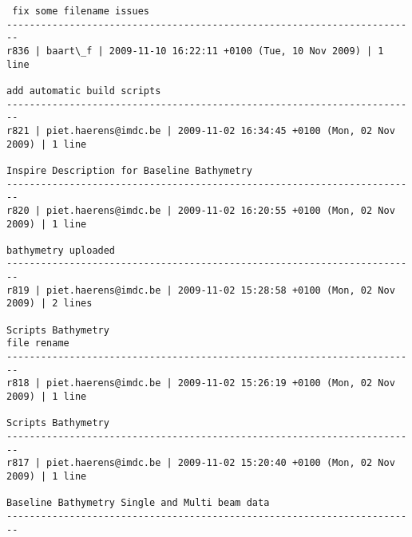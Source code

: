\documentclass[9]{report}
\begin{document}
\begin{description}
\begin{verbatim}
 fix some filename issues
------------------------------------------------------------------------
r836 | baart\_f | 2009-11-10 16:22:11 +0100 (Tue, 10 Nov 2009) | 1 line

add automatic build scripts
------------------------------------------------------------------------
r821 | piet.haerens@imdc.be | 2009-11-02 16:34:45 +0100 (Mon, 02 Nov 2009) | 1 line

Inspire Description for Baseline Bathymetry
------------------------------------------------------------------------
r820 | piet.haerens@imdc.be | 2009-11-02 16:20:55 +0100 (Mon, 02 Nov 2009) | 1 line

bathymetry uploaded
------------------------------------------------------------------------
r819 | piet.haerens@imdc.be | 2009-11-02 15:28:58 +0100 (Mon, 02 Nov 2009) | 2 lines

Scripts Bathymetry
file rename
------------------------------------------------------------------------
r818 | piet.haerens@imdc.be | 2009-11-02 15:26:19 +0100 (Mon, 02 Nov 2009) | 1 line

Scripts Bathymetry
------------------------------------------------------------------------
r817 | piet.haerens@imdc.be | 2009-11-02 15:20:40 +0100 (Mon, 02 Nov 2009) | 1 line

Baseline Bathymetry Single and Multi beam data
------------------------------------------------------------------------


\end{verbatim}
\end{description}
\end{document}
